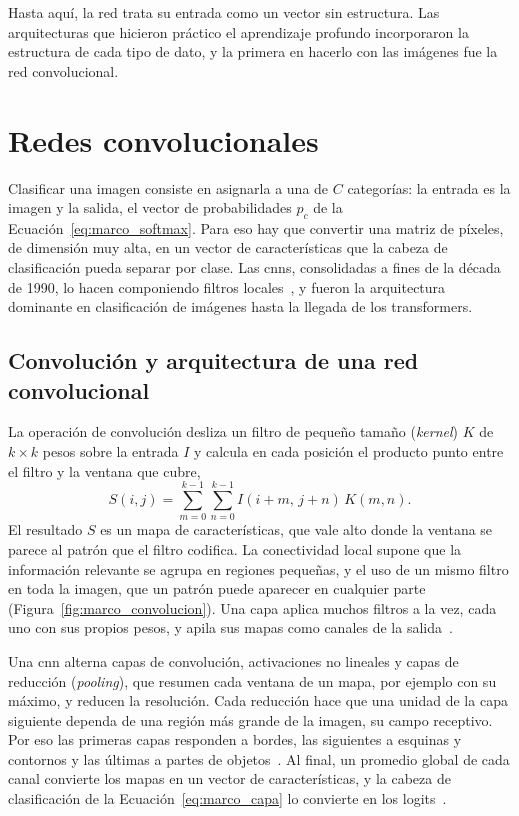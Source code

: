 Hasta aquí, la red trata su entrada como un vector sin estructura. Las arquitecturas que hicieron práctico el
aprendizaje profundo incorporaron la estructura de cada tipo de dato, y la primera en hacerlo con las imágenes
fue la red convolucional.

\section{Redes convolucionales}
\label{sec:marco_vision}

Clasificar una imagen consiste en asignarla a una de $C$ categorías: la entrada es la imagen y la salida, el
vector de probabilidades $p_c$ de la Ecuación~\ref{eq:marco_softmax}. Para eso hay que convertir una matriz
de píxeles, de dimensión muy alta, en un vector de características que la cabeza de clasificación pueda
separar por clase. Las \glspl{cnn}, consolidadas a fines de la década de 1990, lo hacen componiendo filtros
locales~\cite{lecun1998gradient}, y fueron la arquitectura dominante en clasificación de imágenes hasta la
llegada de los transformers.

\subsection{Convolución y arquitectura de una red convolucional}
\label{sec:marco_cnn}

La operación de convolución desliza un filtro de pequeño tamaño (\emph{kernel}) $K$ de $k \times k$ pesos
sobre la entrada $I$ y calcula en cada posición el producto punto entre el filtro y la ventana que cubre,
\begin{equation}
    S(i, j) = \sum_{m=0}^{k-1}\sum_{n=0}^{k-1} I(i+m,\, j+n)\, K(m, n).
    \label{eq:marco_convolucion}
\end{equation}
El resultado $S$ es un mapa de características, que vale alto donde la ventana se parece al patrón que el
filtro codifica. La conectividad local supone que la información relevante se agrupa en regiones pequeñas, y
el uso de un mismo filtro en toda la imagen, que un patrón puede aparecer en cualquier parte
(Figura~\ref{fig:marco_convolucion}). Una capa aplica muchos filtros a la vez, cada uno con sus propios pesos,
y apila sus mapas como canales de la salida~\cite{lecun1998gradient,goodfellow2016deep}.



Una \gls{cnn} alterna capas de convolución, activaciones no lineales y capas de reducción (\emph{pooling}),
que resumen cada ventana de un mapa, por ejemplo con su máximo, y reducen la resolución. Cada reducción hace que
una unidad de la capa siguiente dependa de una región más grande de la imagen, su campo receptivo. Por eso las
primeras capas responden a bordes, las siguientes a esquinas y contornos y las últimas a partes de
objetos~\cite{goodfellow2016deep}. Al final, un promedio global de cada canal convierte los mapas en un vector
de características, y la cabeza de clasificación de la Ecuación~\ref{eq:marco_capa} lo convierte en los
logits~\cite{he2015residual}.

